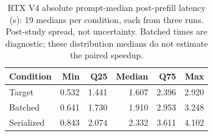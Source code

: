 \begin{table}[t]
\caption{RTX V4 absolute prompt-median post-prefill latency (s): 19 medians per condition, each from three runs. Post-study spread, not uncertainty. Batched times are diagnostic; these distribution medians do not estimate the paired speedup.}
\label{tab:rtxv4absolute}
\centering
\begin{tabular}{@{}lrrrrr@{}}
\toprule
Condition & Min & Q25 & Median & Q75 & Max \\
\midrule
Target & 0.532 & 1.441 & 1.607 & 2.396 & 2.920 \\
Batched & 0.641 & 1.730 & 1.910 & 2.953 & 3.248 \\
Serialized & 0.843 & 2.074 & 2.332 & 3.611 & 4.102 \\
\bottomrule
\end{tabular}
\end{table}
